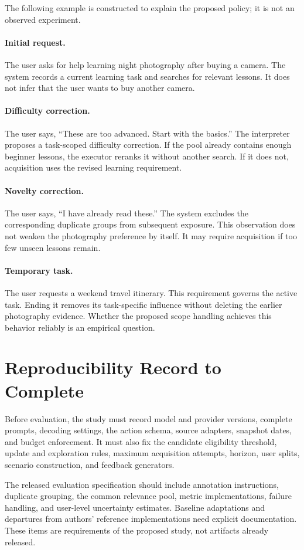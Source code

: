 \documentclass[11pt]{article}
\begin{document}
The following example is constructed to explain the proposed policy; it is not an observed experiment.

\paragraph{Initial request.}
The user asks for help learning night photography after buying a camera. The system records a current learning task and searches for relevant lessons. It does not infer that the user wants to buy another camera.

\paragraph{Difficulty correction.}
The user says, ``These are too advanced. Start with the basics.'' The interpreter proposes a task-scoped difficulty correction. If the pool already contains enough beginner lessons, the executor reranks it without another search. If it does not, acquisition uses the revised learning requirement.

\paragraph{Novelty correction.}
The user says, ``I have already read these.'' The system excludes the corresponding duplicate groups from subsequent exposure. This observation does not weaken the photography preference by itself. It may require acquisition if too few unseen lessons remain.

\paragraph{Temporary task.}
The user requests a weekend travel itinerary. This requirement governs the active task. Ending it removes its task-specific influence without deleting the earlier photography evidence. Whether the proposed scope handling achieves this behavior reliably is an empirical question.

\section{Reproducibility Record to Complete}
\label{app:reproducibility}

Before evaluation, the study must record model and provider versions, complete prompts, decoding settings, the action schema, source adapters, snapshot dates, and budget enforcement. It must also fix the candidate eligibility threshold, update and exploration rules, maximum acquisition attempts, horizon, user splits, scenario construction, and feedback generators.

The released evaluation specification should include annotation instructions, duplicate grouping, the common relevance pool, metric implementations, failure handling, and user-level uncertainty estimates. Baseline adaptations and departures from authors' reference implementations need explicit documentation. These items are requirements of the proposed study, not artifacts already released.
\end{document}
